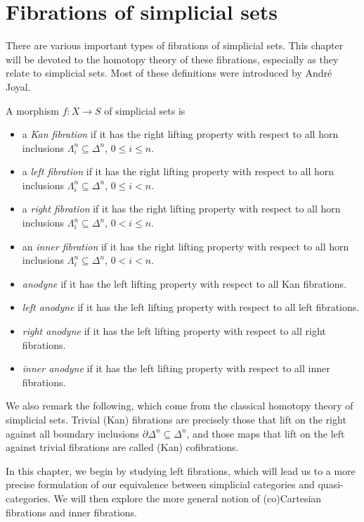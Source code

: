 \chapter{Fibrations of simplicial sets}

There are various important types of fibrations of simplicial sets. This chapter will be devoted to the homotopy theory of these fibrations, especially as they relate to simplicial sets. Most of these definitions were introduced by Andr\'e Joyal.

\begin{definition}[Joyal]\label{2.0.0.1}
	A morphism $f : X \to S$ of simplicial sets is
	\begin{itemize}
		\item a \emph{Kan fibration} if it has the right lifting property with respect to all horn inclusions $\Lambda _i^n \subseteq \Delta ^n$, $0\leq i\leq n$.
		\item a \emph{left fibration} if it has the right lifting property with respect to all horn inclusions $\Lambda _i^n \subseteq \Delta ^n$, $0\leq i<n$.
		\item a \emph{right fibration} if it has the right lifting property with respect to all horn inclusions $\Lambda _i^n \subseteq \Delta ^n$, $0<i\leq n$.
		\item an \emph{inner fibration} if it has the right lifting property with respect to all horn inclusions $\Lambda _i^n \subseteq \Delta ^n$, $0<i<n$.
		\item \emph{anodyne} if it has the left lifting property with respect to all Kan fibrations.
		\item \emph{left anodyne} if it has the left lifting property with respect to all left fibrations.
		\item \emph{right anodyne} if it has the left lifting property with respect to all right fibrations.
		\item \emph{inner anodyne} if it has the left lifting property with respect to all inner fibrations.
	\end{itemize}
\end{definition}

We also remark the following, which come from the classical homotopy theory of simplicial sets. Trivial (Kan) fibrations are precisely those that lift on the right against all boundary inclusions $\partial \Delta ^n \subseteq \Delta ^n$, and those maps that lift on the left against trivial fibrations are called (Kan) cofibrations.

In this chapter, we begin by studying left fibrations, which will lead us to a more precise formulation of our equivalence between simplicial categories and quasi-categories. We will then explore the more general notion of (co)Cartesian fibrations and inner fibrations.

